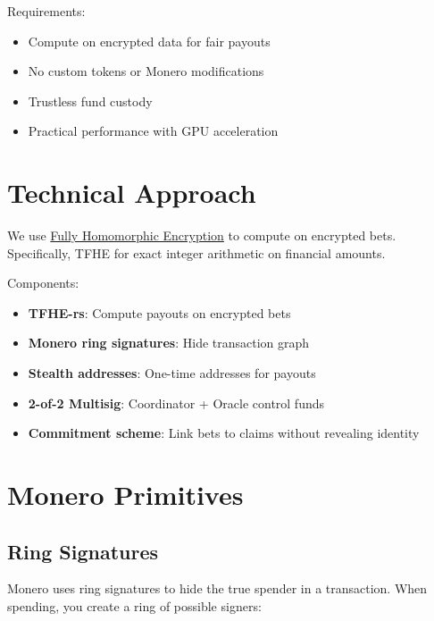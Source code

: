 \documentclass{article}
\begin{document}
Requirements:

\begin{itemize}
\item Compute on encrypted data for fair payouts

\item No custom tokens or Monero modifications

\item Trustless fund custody

\item Practical performance with GPU acceleration

\end{itemize}

\section{Technical Approach}

We use \href{https://en.wikipedia.org/wiki/Homomorphic_encryption}{Fully Homomorphic Encryption} to compute on encrypted bets. Specifically, TFHE for exact integer arithmetic on financial amounts.

Components:

\begin{itemize}
\item \textbf{TFHE-rs}: Compute payouts on encrypted bets

\item \textbf{Monero ring signatures}: Hide transaction graph

\item \textbf{Stealth addresses}: One-time addresses for payouts

\item \textbf{2-of-2 Multisig}: Coordinator + Oracle control funds

\item \textbf{Commitment scheme}: Link bets to claims without revealing identity

\end{itemize}

\section{Monero Primitives}

\subsection{Ring Signatures}

Monero uses ring signatures to hide the true spender in a transaction. When spending, you create a ring of possible signers:
\end{document}
